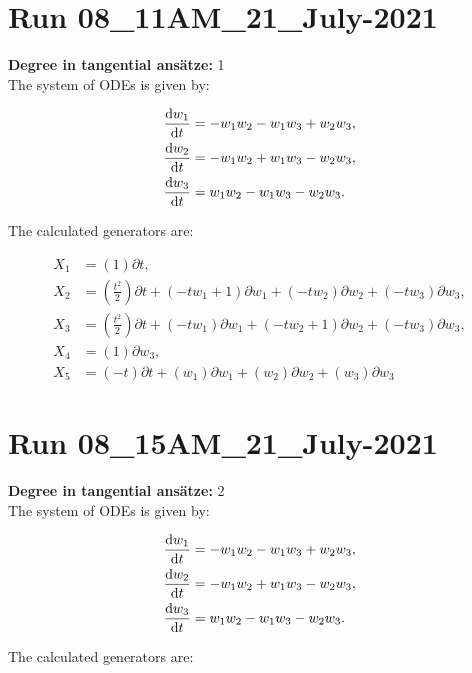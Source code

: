 \section*{Run 08\_11AM\_21\_July-2021}
\textbf{Degree in tangential ansätze:}	1\\
The system of ODEs is given by:

\begin{align*}
\dv{w_{1}}{t}&=- w_{1} w_{2} - w_{1} w_{3} + w_{2} w_{3},\\
\dv{w_{2}}{t}&=- w_{1} w_{2} + w_{1} w_{3} - w_{2} w_{3},\\
\dv{w_{3}}{t}&=w_{1} w_{2} - w_{1} w_{3} - w_{2} w_{3}.\\
\end{align*}

\noindent The calculated generators are:

\begin{align*}
X_{1}&=\left( 1 \right)\partial t,\\
X_{2}&=\left( \frac{t^{2}}{2} \right)\partial t+\left( - t w_{1} + 1 \right)\partial w_{1}+\left( - t w_{2} \right)\partial w_{2}+\left( - t w_{3} \right)\partial w_{3},\\
X_{3}&=\left( \frac{t^{2}}{2} \right)\partial t+\left( - t w_{1} \right)\partial w_{1}+\left( - t w_{2} + 1 \right)\partial w_{2}+\left( - t w_{3} \right)\partial w_{3},\\
X_{4}&=\left( 1 \right)\partial w_{3},\\
X_{5}&=\left( - t \right)\partial t+\left( w_{1} \right)\partial w_{1}+\left( w_{2} \right)\partial w_{2}+\left( w_{3} \right)\partial w_{3}\end{align*}
\section*{Run 08\_15AM\_21\_July-2021}
\textbf{Degree in tangential ansätze:}	2\\
The system of ODEs is given by:

\begin{align*}
\dv{w_{1}}{t}&=- w_{1} w_{2} - w_{1} w_{3} + w_{2} w_{3},\\
\dv{w_{2}}{t}&=- w_{1} w_{2} + w_{1} w_{3} - w_{2} w_{3},\\
\dv{w_{3}}{t}&=w_{1} w_{2} - w_{1} w_{3} - w_{2} w_{3}.\\
\end{align*}

\noindent The calculated generators are:

